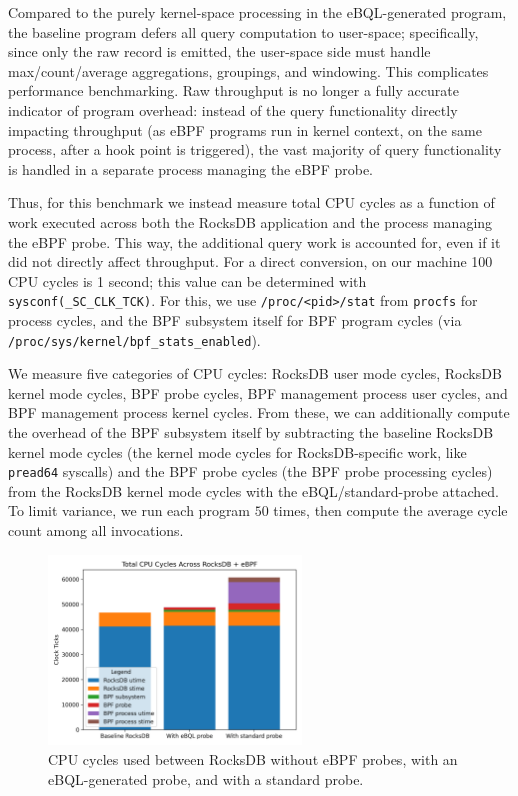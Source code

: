 Compared to the purely kernel-space processing in the eBQL-generated program, the baseline program
defers all query computation to user-space; specifically, since only the raw record is emitted, the
user-space side must handle max/count/average aggregations, groupings, and windowing. This
complicates performance benchmarking. Raw throughput is no longer a fully accurate indicator of
program overhead: instead of the query functionality directly impacting throughput (as eBPF programs
run in kernel context, on the same process, after a hook point is triggered), the vast majority of
query functionality is handled in a separate process managing the eBPF probe.

Thus, for this benchmark we instead measure total CPU cycles as a function of work executed across
both the RocksDB application and the process managing the eBPF probe. This way, the additional query
work is accounted for, even if it did not directly affect throughput. For a direct conversion, on
our machine 100 CPU cycles is 1 second; this value can be determined with
\texttt{sysconf(\_SC\_CLK\_TCK)}. For this, we use \texttt{/proc/<pid>/stat} from \texttt{procfs}
for process cycles, and the BPF subsystem itself for BPF program cycles (via
\texttt{/proc/sys/kernel/bpf\_stats\_enabled}).

We measure five categories of CPU cycles: RocksDB user mode cycles, RocksDB kernel mode cycles, BPF
probe cycles, BPF management process user cycles, and BPF management process kernel cycles. From
these, we can additionally compute the overhead of the BPF subsystem itself by subtracting the
baseline RocksDB kernel mode cycles (the kernel mode cycles for RocksDB-specific work, like
\texttt{pread64} syscalls) and the BPF probe cycles (the BPF probe processing cycles) from the
RocksDB kernel mode cycles with the eBQL/standard-probe attached. To limit variance, we run each
program $50$ times, then compute the average cycle count among all invocations.

\begin{figure}[htpb]
    \centering
    \includegraphics[width=0.6\textwidth]{diagrams/baseline-eval-cycles.png}
    \caption{CPU cycles used between RocksDB without eBPF probes, with an eBQL-generated probe, and
    with a standard probe.}
    \label{fig:baseline-eval-cycles}
\end{figure}

